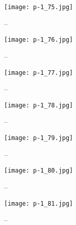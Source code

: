 \clearpage


\begin{figure}
    \begin{center}
        \texttt{[image: p-1\_75.jpg]}
        \caption{--}
    \end{center}
\end{figure}

\clearpage


\begin{figure}
    \begin{center}
        \texttt{[image: p-1\_76.jpg]}
        \caption{--}
    \end{center}
\end{figure}

\clearpage


\begin{figure}
    \begin{center}
        \texttt{[image: p-1\_77.jpg]}
        \caption{--}
    \end{center}
\end{figure}

\clearpage


\begin{figure}
    \begin{center}
        \texttt{[image: p-1\_78.jpg]}
        \caption{--}
    \end{center}
\end{figure}

\clearpage


\begin{figure}
    \begin{center}
        \texttt{[image: p-1\_79.jpg]}
        \caption{--}
    \end{center}
\end{figure}

\clearpage


\begin{figure}
    \begin{center}
        \texttt{[image: p-1\_80.jpg]}
        \caption{--}
    \end{center}
\end{figure}

\clearpage


\begin{figure}
    \begin{center}
        \texttt{[image: p-1\_81.jpg]}
        \caption{--}
    \end{center}
\end{figure}

